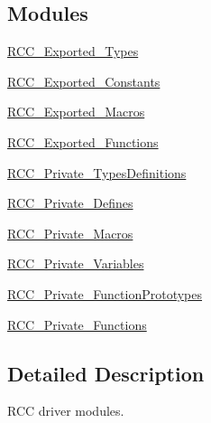 \subsection*{Modules}
\begin{DoxyCompactItemize}
\item 
\hyperlink{group___r_c_c___exported___types}{R\+C\+C\+\_\+\+Exported\+\_\+\+Types}
\item 
\hyperlink{group___r_c_c___exported___constants}{R\+C\+C\+\_\+\+Exported\+\_\+\+Constants}
\item 
\hyperlink{group___r_c_c___exported___macros}{R\+C\+C\+\_\+\+Exported\+\_\+\+Macros}
\item 
\hyperlink{group___r_c_c___exported___functions}{R\+C\+C\+\_\+\+Exported\+\_\+\+Functions}
\item 
\hyperlink{group___r_c_c___private___types_definitions}{R\+C\+C\+\_\+\+Private\+\_\+\+Types\+Definitions}
\item 
\hyperlink{group___r_c_c___private___defines}{R\+C\+C\+\_\+\+Private\+\_\+\+Defines}
\item 
\hyperlink{group___r_c_c___private___macros}{R\+C\+C\+\_\+\+Private\+\_\+\+Macros}
\item 
\hyperlink{group___r_c_c___private___variables}{R\+C\+C\+\_\+\+Private\+\_\+\+Variables}
\item 
\hyperlink{group___r_c_c___private___function_prototypes}{R\+C\+C\+\_\+\+Private\+\_\+\+Function\+Prototypes}
\item 
\hyperlink{group___r_c_c___private___functions}{R\+C\+C\+\_\+\+Private\+\_\+\+Functions}
\end{DoxyCompactItemize}


\subsection{Detailed Description}
R\+CC driver modules. 

